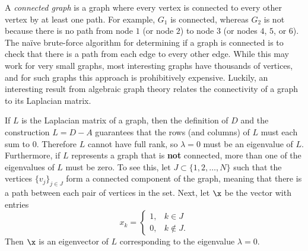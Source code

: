 A \emph{connected graph} is a graph where every vertex is connected to every other vertex by at least one path.
For example, $G_1$ is connected, whereas $G_2$ is not because there is no path from node $1$ (or node $2$) to node $3$ (or nodes $4$, $5$, or $6$).
The na\"ive brute-force algorithm for determining if a graph is connected is to check that there is a path from each edge to every other edge.
While this may work for very small graphs, most interesting graphs have thousands of vertices, and for such graphs this approach is prohibitively expensive.
Luckily, an interesting result from algebraic graph theory relates the connectivity of a graph to its Laplacian matrix.

If $L$ is the Laplacian matrix of a graph, then the definition of $D$ and the construction $L = D - A$ guarantees that the rows (and columns) of $L$ must each sum to $0$.
Therefore $L$ cannot have full rank, so $\lambda = 0$ must be an eigenvalue of $L$.
Furthermore, if $L$ represents a graph that is \textbf{not} connected, more than one of the eigenvalues of $L$ must be zero.
To see this, let $J \subset \{1,2,\ldots,N\}$ such that the vertices $\{v_j\}_{j \in J}$ form a connected component of the graph, meaning that there is a path between each pair of vertices in the set.
Next, let $\x$ be the vector with entries
 \[
x_k = \begin{cases}
1, & k \in J    \\
0, & k \not\in J.
\end{cases}
  \]
Then $\x$ is an eigenvector of $L$ corresponding to the eigenvalue $\lambda = 0$.

